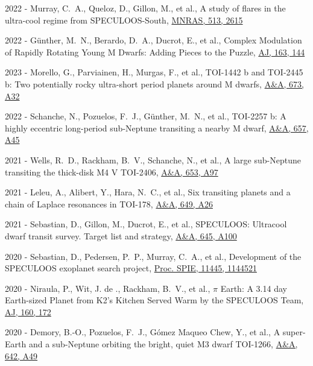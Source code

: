 \documentclass[10pt,letterpaper]{article}
\newcommand{\publi}[4]{\item #1 - #3, #2, #4}
\newcommand{\aj}{AJ}
\newcommand{\mnras}{MNRAS}
\newcommand{\aap}{A\&A}
\newcommand{\procspie}{Proc. SPIE}
\begin{document}
\begin{etaremune}
    \publi{2022}{A study of flares in the ultra-cool regime from SPECULOOS-South}
    {Murray, C.~A., Queloz, D., Gillon, M., et al.}
    {\href{https://ui.adsabs.harvard.edu/abs/2022MNRAS.513.2615M}{\mnras, 513, 2615}}
    
    \publi{2022}{Complex Modulation of Rapidly Rotating Young M Dwarfs: Adding Pieces to the Puzzle}
    {G{\"u}nther, M.~N., Berardo, D.~A., Ducrot, E., et al.}
    {\href{https://ui.adsabs.harvard.edu/abs/2022AJ....163..144G}{\aj, 163, 144}}
    
    \publi{2023}{TOI-1442 b and TOI-2445 b: Two potentially rocky ultra-short period planets around M dwarfs}
    {Morello, G., Parviainen, H., Murgas, F., et al.}
    {\href{https://ui.adsabs.harvard.edu/abs/2023A\&A...673A..32M}{\aap, 673, A32}}
        
    \publi{2022}{TOI-2257 b: A highly eccentric long-period sub-Neptune transiting a nearby M dwarf}
    {Schanche, N., Pozuelos, F.~J., G{\"u}nther, M.~N., et al.}
    {\href{https://ui.adsabs.harvard.edu/abs/2022A\&A...657A..45S}{\aap, 657, A45}}
    
    \publi{2021}{A large sub-Neptune transiting the thick-disk M4 V TOI-2406}
    {Wells, R.~D., Rackham, B.~V., Schanche, N., et al.}
    {\href{https://ui.adsabs.harvard.edu/abs/2021A\&A...653A..97W}{\aap, 653, A97}}
    
    \publi{2021}{Six transiting planets and a chain of Laplace resonances in TOI-178}
    {Leleu, A., Alibert, Y., Hara, N.~C., et al.}
    {\href{https://ui.adsabs.harvard.edu/abs/2021A\&A...649A..26L}{\aap, 649, A26}}
    
    \publi{2021}{SPECULOOS: Ultracool dwarf transit survey. Target list and strategy}
    {Sebastian, D., Gillon, M., Ducrot, E., et al.}
    {\href{https://ui.adsabs.harvard.edu/abs/2021A\&A...645A.100S}{\aap, 645, A100}}
    
    \publi{2020}{Development of the SPECULOOS exoplanet search project}
    {Sebastian, D., Pedersen, P.~P., Murray, C.~A., et al.}
    {\href{https://ui.adsabs.harvard.edu/abs/2020SPIE11445E..21S}{\procspie, 11445, 1144521}}
    
    \publi{2020}{{\ensuremath{\pi}} Earth: A 3.14 day Earth-sized Planet from K2's Kitchen Served Warm by the SPECULOOS Team}
    {Niraula, P., Wit, J. de ., Rackham, B.~V., et al.}
    {\href{https://ui.adsabs.harvard.edu/abs/2020AJ....160..172N}{\aj, 160, 172}}
    
    \publi{2020}{A super-Earth and a sub-Neptune orbiting the bright, quiet M3 dwarf TOI-1266}
    {Demory, B.-O., Pozuelos, F.~J., G{\'o}mez Maqueo Chew, Y., et al.}
    {\href{https://ui.adsabs.harvard.edu/abs/2020A\&A...642A..49D}{\aap, 642, A49}}
    

\end{etaremune}
\end{document}

